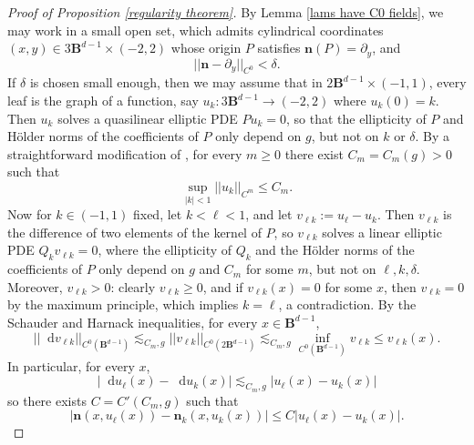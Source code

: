 \documentclass[reqno,11pt]{amsart}
\newcommand{\Ball}{\mathbf{B}}
\newcommand*\dif{\mathop{}\!\mathrm{d}}
\newcommand{\normal}{\mathbf n}
\theoremstyle{definition}
\numberwithin{equation}{section}
\begin{document}
\begin{proof}[Proof of Proposition \ref{regularity theorem}]
By Lemma \ref{lams have C0 fields}, we may work in a small open set, which admits cylindrical coordinates $(x, y) \in 3\Ball^{d - 1} \times (-2, 2)$ whose origin $P$ satisfies $\normal(P) = \partial_y$, and
\begin{equation}\label{normal is almost constant}
||\normal - \partial_y||_{C^0} < \delta.
\end{equation}
If $\delta$ is chosen small enough, then we may assume that in $2\Ball^{d - 1} \times (-1, 1)$,
every leaf is the graph of a function, say $u_k: 3\Ball^{d - 1} \to (-2, 2)$ where $u_k(0) = k$.
Then $u_k$ solves a quasilinear elliptic PDE $Pu_k = 0$, so that the ellipticity of $P$ and H\"older norms of the coefficients of $P$ only depend on $g$, but not on $k$ or $\delta$.
By a straightforward modification of \cite[Corollary 16.7]{gilbarg2015elliptic}, for every $m \geq 0$ there exist $C_m = C_m(g) > 0$ such that
\begin{equation}\label{norms on uk}
\sup_{|k| < 1} ||u_k||_{C^m} \leq C_m.
\end{equation}
Now for $k \in (-1, 1)$ fixed, let $k < \ell < 1$, and let $v_{\ell k} := u_\ell - u_k$.
Then $v_{\ell k}$ is the difference of two elements of the kernel of $P$, so $v_{\ell k}$ solves a linear elliptic PDE $Q_k v_{\ell k} = 0$, where the ellipticity of $Q_k$ and the H\"older norms of the coefficients of $P$ only depend on $g$ and $C_m$ for some $m$, but not on $\ell, k, \delta$.
Moreover, $v_{\ell k} > 0$: clearly $v_{\ell k} \geq 0$, and if $v_{\ell k}(x) = 0$ for some $x$, then $v_{\ell k} = 0$ by the maximum principle, which implies $k = \ell$, a contradiction.
By the Schauder \cite[Theorem 6.2]{gilbarg2015elliptic} and Harnack \cite[Theorem 9.25]{gilbarg2015elliptic} inequalities, for every $x \in \Ball^{d - 1}$,
$$||\dif v_{\ell k}||_{C^0(\Ball^{d - 1})} \lesssim_{C_m, g} ||v_{\ell k}||_{C^0(2 \Ball^{d - 1})} \lesssim_{C_m, g} \inf_{C^0(\Ball^{d - 1})} v_{\ell k} \leq v_{\ell k}(x).$$
In particular, for every $x$,
$$|\dif u_\ell(x) - \dif u_k(x)| \lesssim_{C_m, g} |u_\ell(x) - u_k(x)|$$
so there exists $C = C'(C_m, g)$ such that
\begin{equation}\label{vertical Lipschitz}
|\normal(x, u_\ell(x)) - \normal_k(x, u_k(x))| \leq C |u_\ell(x) - u_k(x)|.
\end{equation}


\end{proof}
\end{document}
